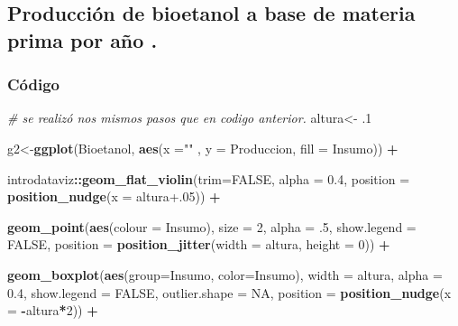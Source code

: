 \documentclass[
]{article}
\newenvironment{Shaded}{\begin{snugshade}}{\end{snugshade}}
\newcommand{\AttributeTok}[1]{\textcolor[rgb]{0.13,0.29,0.53}{#1}}
\newcommand{\CommentTok}[1]{\textcolor[rgb]{0.56,0.35,0.01}{\textit{#1}}}
\newcommand{\ConstantTok}[1]{\textcolor[rgb]{0.56,0.35,0.01}{#1}}
\newcommand{\DecValTok}[1]{\textcolor[rgb]{0.00,0.00,0.81}{#1}}
\newcommand{\FloatTok}[1]{\textcolor[rgb]{0.00,0.00,0.81}{#1}}
\newcommand{\FunctionTok}[1]{\textcolor[rgb]{0.13,0.29,0.53}{\textbf{#1}}}
\newcommand{\NormalTok}[1]{#1}
\newcommand{\OtherTok}[1]{\textcolor[rgb]{0.56,0.35,0.01}{#1}}
\newcommand{\SpecialCharTok}[1]{\textcolor[rgb]{0.81,0.36,0.00}{\textbf{#1}}}
\newcommand{\StringTok}[1]{\textcolor[rgb]{0.31,0.60,0.02}{#1}}
\begin{document}
\subsection{Producción de bioetanol a base de materia prima por año
.}\label{producciuxf3n-de-bioetanol-a-base-de-materia-prima-por-auxf1o-.}

\subsubsection{Código}\label{cuxf3digo-1}

\begin{Shaded}
\begin{Highlighting}[]
\CommentTok{\# se realizó nos mismos pasos que en codigo anterior.}
\NormalTok{altura}\OtherTok{\textless{}{-}}\NormalTok{ .}\DecValTok{1}

\NormalTok{g2}\OtherTok{\textless{}{-}}\FunctionTok{ggplot}\NormalTok{(Bioetanol,}
       \FunctionTok{aes}\NormalTok{(}\AttributeTok{x =}\StringTok{""}\NormalTok{ ,}
           \AttributeTok{y =}\NormalTok{ Produccion,}
           \AttributeTok{fill =}\NormalTok{ Insumo)) }\SpecialCharTok{+}
  
\NormalTok{  introdataviz}\SpecialCharTok{::}\FunctionTok{geom\_flat\_violin}\NormalTok{(}\AttributeTok{trim=}\ConstantTok{FALSE}\NormalTok{, }
                                 \AttributeTok{alpha =} \FloatTok{0.4}\NormalTok{,}
                                 \AttributeTok{position =} \FunctionTok{position\_nudge}\NormalTok{(}\AttributeTok{x =}\NormalTok{ altura}\FloatTok{+.05}\NormalTok{)) }\SpecialCharTok{+}
  
  \FunctionTok{geom\_point}\NormalTok{(}\FunctionTok{aes}\NormalTok{(}\AttributeTok{colour =}\NormalTok{ Insumo),}
             \AttributeTok{size =} \DecValTok{2}\NormalTok{,}
             \AttributeTok{alpha =}\NormalTok{ .}\DecValTok{5}\NormalTok{,}
             \AttributeTok{show.legend =} \ConstantTok{FALSE}\NormalTok{, }
             \AttributeTok{position =} \FunctionTok{position\_jitter}\NormalTok{(}\AttributeTok{width =}\NormalTok{ altura, }\AttributeTok{height =} \DecValTok{0}\NormalTok{)) }\SpecialCharTok{+}
  
  \FunctionTok{geom\_boxplot}\NormalTok{(}\FunctionTok{aes}\NormalTok{(}\AttributeTok{group=}\NormalTok{Insumo, }\AttributeTok{color=}\NormalTok{Insumo),}
               \AttributeTok{width =}\NormalTok{ altura,}
               \AttributeTok{alpha =} \FloatTok{0.4}\NormalTok{, }
               \AttributeTok{show.legend =} \ConstantTok{FALSE}\NormalTok{, }
               \AttributeTok{outlier.shape =} \ConstantTok{NA}\NormalTok{,}
               \AttributeTok{position =} \FunctionTok{position\_nudge}\NormalTok{(}\AttributeTok{x =} \SpecialCharTok{{-}}\NormalTok{altura}\SpecialCharTok{*}\DecValTok{2}\NormalTok{)) }\SpecialCharTok{+}
  

\end{Highlighting}
\end{Shaded}
\end{document}
